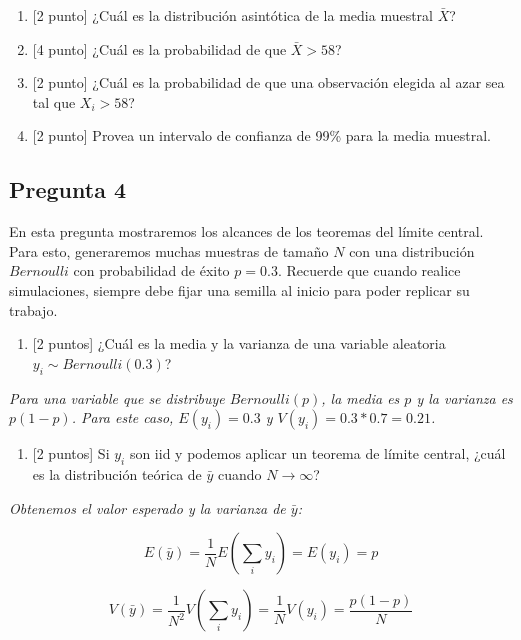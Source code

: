 \documentclass[
  letterpaper,
  DIV=11,
  numbers=noendperiod]{scrartcl}
\providecommand{\tightlist}{%
  \setlength{\itemsep}{0pt}\setlength{\parskip}{0pt}}\usepackage{longtable,booktabs,array}
\begin{document}
\begin{enumerate}
\def\labelenumi{\alph{enumi}.}
\item
  {[}2 punto{]} ¿Cuál es la distribución asintótica de la media muestral
  \(\bar{X}\)?
\item
  {[}4 punto{]} ¿Cuál es la probabilidad de que \(\bar{X}>58\)?
\item
  {[}2 punto{]} ¿Cuál es la probabilidad de que una observación elegida
  al azar sea tal que \(X_i>58\)?
\item
  {[}2 punto{]} Provea un intervalo de confianza de 99\% para la media
  muestral.
\end{enumerate}

\hypertarget{pregunta-4}{%
\subsection{Pregunta 4}\label{pregunta-4}}

En esta pregunta mostraremos los alcances de los teoremas del límite
central. Para esto, generaremos muchas muestras de tamaño \(N\) con una
distribución \(Bernoulli\) con probabilidad de éxito \(p=0.3\). Recuerde
que cuando realice simulaciones, siempre debe fijar una semilla al
inicio para poder replicar su trabajo.

\begin{enumerate}
\def\labelenumi{\alph{enumi}.}
\tightlist
\item
  {[}2 puntos{]} ¿Cuál es la media y la varianza de una variable
  aleatoria \(y_i \sim Bernoulli(0.3)\)?
\end{enumerate}

\emph{Para una variable que se distribuye \(Bernoulli(p)\), la media es
\(p\) y la varianza es \(p(1-p)\). Para este caso, \(E(y_i)=0.3\) y
\(V(y_i)=0.3*0.7=0.21\).}

\begin{enumerate}
\def\labelenumi{\alph{enumi}.}
\tightlist
\item
  {[}2 puntos{]} Si \(y_i\) son iid y podemos aplicar un teorema de
  límite central, ¿cuál es la distribución teórica de \(\bar{y}\) cuando
  \(N\to\infty\)?
\end{enumerate}

\emph{Obtenemos el valor esperado y la varianza de \(\bar{y}\):}

\emph{\[E(\bar{y})=\frac{1}{N}E(\sum_i y_i)  = E(y_i)=p\]}

\emph{\[V(\bar{y})=\frac{1}{N^2}V(\sum_i y_i) = \frac{1}{N}V(y_i)=\frac{p(1-p)}{N}\]}
\end{document}
